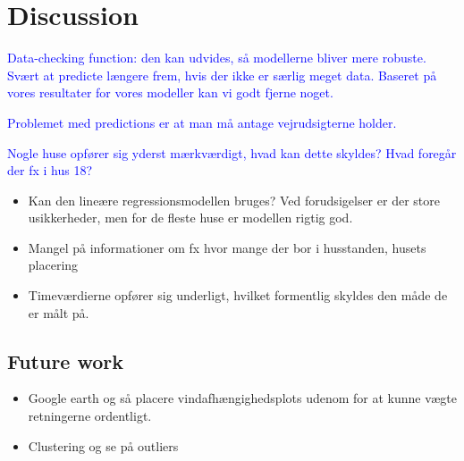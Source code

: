 \chapter{Discussion}

\textcolor{blue}{Data-checking function: den kan udvides, så modellerne bliver mere robuste. Svært at predicte længere frem, hvis der ikke er særlig meget data. Baseret på vores resultater for vores modeller kan vi godt fjerne noget.} 

\textcolor{blue}{Problemet med predictions er at man må antage vejrudsigterne holder.} 

\textcolor{blue}{Nogle huse opfører sig yderst mærkværdigt, hvad kan dette skyldes? Hvad foregår der fx i hus 18?}

\begin{itemize}
    \item Kan den lineære regressionsmodellen bruges? Ved forudsigelser er der store usikkerheder, men for de fleste huse er modellen rigtig god. 
    \item Mangel på informationer om fx hvor mange der bor i husstanden, husets placering 
    \item Timeværdierne opfører sig underligt, hvilket formentlig skyldes den måde de er målt på. 
\end{itemize}

\section{Future work}
\begin{itemize}
    \item Google earth og så placere vindafhængighedsplots udenom for at kunne vægte retningerne ordentligt. 
    \item Clustering og se på outliers
\end{itemize}